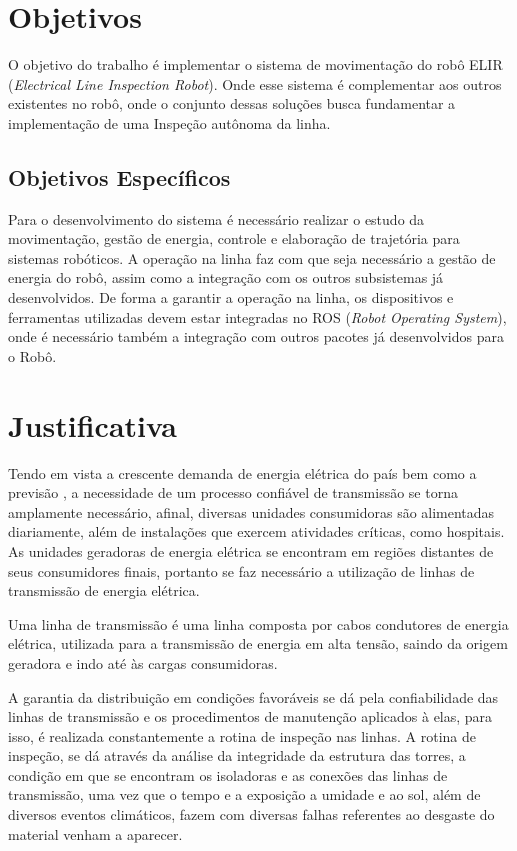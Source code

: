 \section{Objetivos}
\label{sec:obj}
O objetivo do trabalho é implementar o sistema de movimentação do robô ELIR (\textit{Electrical Line Inspection Robot}). Onde esse sistema é complementar aos outros existentes no robô, onde o conjunto dessas soluções busca fundamentar a implementação de uma Inspeção autônoma da linha.


\subsection{Objetivos Específicos}
\label{ssec:objesp}
Para o desenvolvimento do sistema é necessário realizar o estudo da movimentação, gestão de energia, controle e elaboração de trajetória para sistemas robóticos. A operação na linha faz com que seja necessário a gestão de energia do robô, assim como a integração com os outros subsistemas já desenvolvidos. De forma a garantir a operação na linha, os dispositivos e ferramentas utilizadas devem estar integradas no ROS (\textit{Robot Operating System}), onde é necessário também a integração com outros pacotes já desenvolvidos para o Robô.

\section{Justificativa}
\label{sec:justi}
 Tendo em vista a crescente demanda de energia elétrica do país bem como a previsão , a necessidade de um processo confiável de transmissão se torna amplamente necessário, afinal, diversas unidades consumidoras são alimentadas diariamente, além de instalações que exercem atividades críticas, como hospitais. As unidades geradoras de energia elétrica se encontram em regiões distantes de seus consumidores finais, portanto se faz necessário a utilização de linhas de transmissão de energia elétrica. 
 
 Uma linha de transmissão é uma linha composta por cabos condutores de energia elétrica, utilizada para a transmissão de energia em alta tensão, saindo da origem geradora e indo até às cargas consumidoras.
 
 A garantia da distribuição em condições favoráveis se dá pela confiabilidade das linhas de transmissão e os procedimentos de manutenção aplicados à elas, para isso, é realizada constantemente a rotina de inspeção nas linhas. A rotina de inspeção, se dá através da análise da integridade da estrutura das torres, a condição em que se encontram os isoladoras e as conexões das linhas de transmissão, uma vez que o tempo e a exposição a umidade e ao sol, além de diversos eventos climáticos, fazem com diversas falhas referentes ao desgaste do material venham a aparecer. 
 
